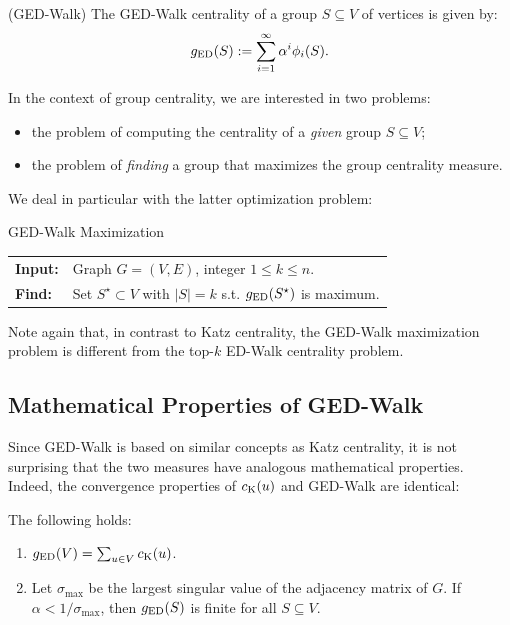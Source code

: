 \begin{definition}(GED-Walk)
The GED-Walk centrality of a group $S \subseteq V$ of vertices
is given by:
%
\begin{equation}
\label{eq:ged-walk:ged-walk}
g_{\text{ED}}(S) := \sum_{i = 1}^{\infty}\alpha^i\phi_i(S).
\end{equation}
\end{definition}

In the context of group centrality, we are interested in two
problems:
\begin{itemize}
    \item the problem of computing the centrality of a \emph{given} group
        $S \subseteq V$;
    \item the problem of \emph{finding} a group that maximizes the
        group centrality measure.
\end{itemize}

We deal in particular with the latter optimization problem:

\begin{cproblem}{GED-Walk Maximization}
\begin{tabular}{ll}
\textbf{Input:} & Graph $G = (V, E)$, integer $1 \le k \le n$.\\
\textbf{Find:} & Set $S^\star \subset V$ with $|S| = k$ s.t. $g_{\text{ED}}(S^\star)$ is maximum.
\end{tabular}
\end{cproblem}

Note again that, in contrast to Katz centrality, the GED-Walk maximization problem
is different from the top-$k$ ED-Walk centrality problem.


\subsection{Mathematical Properties of GED-Walk}
\label{sec:ged-walk:math-prop}
%
Since GED-Walk is based on similar concepts as Katz centrality, it is not surprising
that the two measures have analogous mathematical properties. Indeed,
the convergence properties of $c_{\text{K}}(u)$ and GED-Walk are
identical:

\begin{proposition}
\label{prop:ged-walk:convergence}
The following holds:
\begin{enumerate}
    \item $g_{\text{ED}}(V) = \sum_{u \in V}c_{\text{K}}(u)$.
    \item Let $\sigma_{\max}$ be the largest singular value of the adjacency
        matrix of $G$. If $\alpha < 1 / \sigma_{\max}$, then $g_{\text{ED}}(S)$ is
        finite for all $S \subseteq V$.
\end{enumerate}
\end{proposition}

